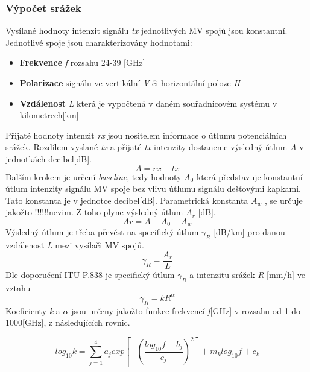 \documentclass[a4paper,12pt]{article}
\begin{document}
\subsubsection{Výpočet srážek}
Vysílané hodnoty intenzit signálu \emph{tx} jednotlivých MV spojů jsou konstantní. Jednotlivé spoje jsou charakterizovány hodnotami:
\begin{itemize}
\item \textbf{Frekvence} \emph{f} rozsahu 24-39 [GHz]
\item \textbf{Polarizace} signálu ve vertikální \emph{V} či horizontální poloze \emph{H}
\item \textbf{Vzdálenost} \emph{L} která je vypočtená v daném souřadnicovém systému v kilometrech[km]
\end{itemize}
Přijaté hodnoty intenzit \emph{rx} jsou nositelem informace o útlumu potenciálních srážek. Rozdílem vyslané \emph{tx} a přijaté \emph{tx} intenzity dostaneme výsledný útlum \emph{A} v jednotkách decibel[dB].
\begin{equation}
 A=rx-tx
\end{equation}
Dalším krokem je určení \emph{baseline}, tedy hodnoty \emph{ $A_{0}$ }   která představuje konstantní útlum intenzity signálu MV spoje bez vlivu útlumu signálu dešťovými kapkami. Tato konstanta je v jednotce decibel[dB]. Parametrická konstanta  \emph{$A_{w}$ }, se určuje jakožto !!!!!!nevim. Z toho plyne výsledný útlum \emph{$A_{r}$ }[dB].
\begin{equation}
 Ar=A-A_{0}-A_{w}
\end{equation}
 Výsledný útlum je třeba převést na specifický útlum \emph{$\gamma_{R} $} [dB/km] pro danou vzdálenost \emph{L} mezi vysílači MV spojů. 
\begin{equation}
\gamma_{R} =\frac{A_{r}}{L}
\end{equation}
Dle doporučení ITU P.838 \cite{itu} je specifický útlum  \emph{$\gamma_{R} $} a intenzitu srážek  \emph{R} [mm/h] ve vztahu
\begin{equation}\label{eq:gamma}
\gamma_{R}=kR^{\alpha}
\end{equation}
Koeficienty \emph{k} a \emph{$\alpha$} jsou určeny jakožto funkce  frekvencí \emph{f}[GHz] v rozsahu od 1 do 1000[GHz], z následujících rovnic.

\begin{equation}
log_{10}k=\sum_{j=1}^{4} a_{j} exp\left [ -\left ( \frac{log_{10}f-b_{j}}{c_{j}} \right )^{2} \right ]+m {_{k}}log_{10}f+c_{k}
\end{equation}
\end{document}
